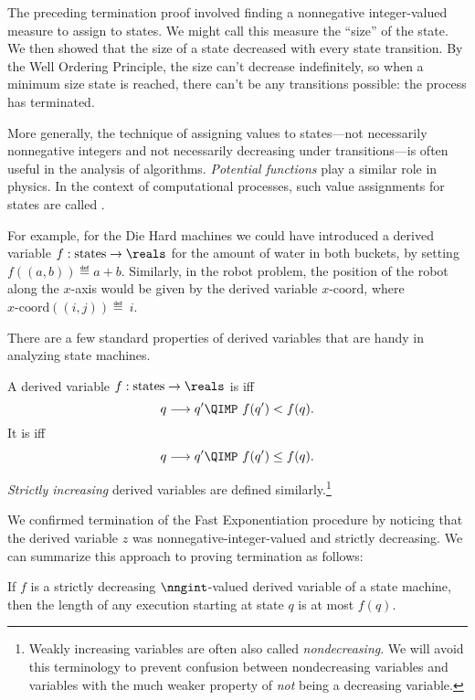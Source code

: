 The preceding termination proof involved finding a nonnegative
integer-valued measure to assign to states.  We might call this measure
the ``size'' of the state.  We then showed that the size of a state
decreased with every state transition.  By the Well Ordering Principle,
the size can't decrease indefinitely, so when a minimum size state is
reached, there can't be any transitions possible: the process has
terminated.

More generally, the technique of assigning values to states---not
necessarily nonnegative integers and not necessarily decreasing under
transitions---is often useful in the analysis of algorithms.
\emph{Potential functions} play a similar role in physics.  In the
context of computational processes, such value assignments for states
are called .

For example, for the Die Hard machines we could have introduced a derived
variable $f:\text{states} \to \reals$ for the amount of water in both
buckets, by setting $f((a, b)) \eqdef a + b$.  Similarly, in the robot
problem, the position of the robot along the $x$-axis would be given by
the derived variable $x\text{-coord}$, where $x\text{-coord}((i, j))
\eqdef~i$.


There are a few standard properties of derived variables that are handy in
analyzing state machines.

\begin{definition}
  A derived variable $f:\text{states} \to \reals$ is  iff
\[
q \movesto q' \QIMP\ f(q') < f(q).
\]
It is  iff
\[
q \movesto q' \QIMP\ f(q') \leq f(q).
\]

\emph{Strictly increasing}%
 derived variables are defined
similarly.\footnote{Weakly increasing variables are often also called
  \emph{nondecreasing}.  We will avoid this terminology to prevent
  confusion between nondecreasing variables and variables with the
  much weaker property of \emph{not} being a decreasing variable.}
\end{definition}

We confirmed termination of the Fast Exponentiation procedure by
noticing that the derived variable $z$ was nonnegative-integer-valued
and strictly decreasing.  We can summarize this approach to proving
termination as follows:
\begin{theorem}\label{th:decr}
If $f$ is a strictly decreasing $\nngint$-valued derived variable of a
state machine, then the length of any execution starting at state $q$ is
at most $f(q)$.
\end{theorem}

